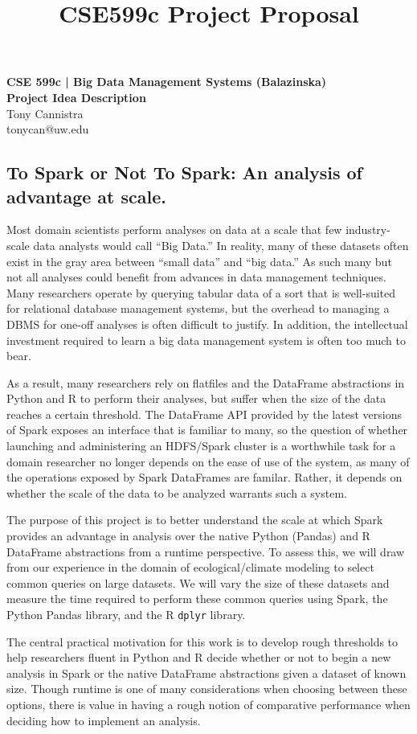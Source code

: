 \documentclass[11pt]{article}
\title{CSE599c Project Proposal}
\begin{document}
\begin{center}
{\bf CSE 599c | Big Data Management Systems (Balazinska)\\
Project Idea Description\\}
Tony Cannistra\\
tonycan@uw.edu
\end{center}


\begin{center}
\section*{To Spark or Not To Spark: An analysis of advantage at scale.}
\end{center}

Most domain scientists perform analyses on data at a scale that few industry-scale data analysts would call ``Big Data.'' In reality, many of these datasets often exist in the gray area between ``small data'' and ``big data.'' As such many but not all analyses could benefit from advances in data management techniques. Many researchers operate by querying tabular data of a sort that is well-suited for relational database management systems, but the overhead to managing a DBMS for one-off analyses is often difficult to justify. In addition, the intellectual investment required to learn a big data management system is often too much to bear. 

As a result, many researchers rely on flatfiles and the DataFrame abstractions in Python and R to perform their analyses, but suffer when the size of the data reaches a certain threshold. The DataFrame API provided by the latest versions of Spark exposes an interface that is familiar to many, so the question of whether launching and administering an HDFS/Spark cluster is a worthwhile task for a domain researcher no longer depends on the ease of use of the system, as many of the operations exposed by Spark DataFrames are familar. Rather, it depends on whether the scale of the data to be analyzed warrants such a system. 

The purpose of this project is to better understand the scale at which Spark provides an advantage in analysis over the native Python (Pandas) and R DataFrame abstractions from a runtime perspective. To assess this, we will draw from our experience in the domain of ecological/climate modeling to select common queries on large datasets. We will vary the size of these datasets and measure the time required to perform these common queries using Spark, the Python Pandas library, and the R \texttt{dplyr} library. 

The central practical motivation for this work is to develop rough thresholds to help researchers fluent in Python and R decide whether or not to begin a new analysis in Spark or the native DataFrame abstractions given a dataset of known size. Though runtime is one of many considerations when choosing between these options, there is value in having a rough notion of comparative performance when deciding how to implement an analysis. 




\end{document}
